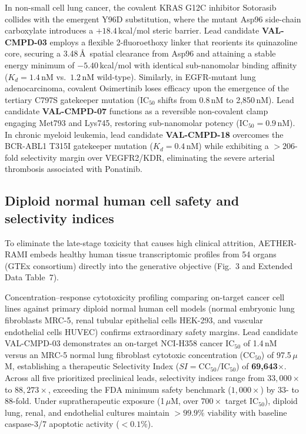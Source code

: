 \documentclass[11pt,a4paper]{article}
\begin{document}
In non-small cell lung cancer, the covalent KRAS G12C inhibitor Sotorasib collides with the emergent Y96D substitution, where the mutant Asp96 side-chain carboxylate introduces a $+18.4$\,kcal/mol steric barrier. Lead candidate \textbf{VAL-CMPD-03} employs a flexible 2-fluoroethoxy linker that reorients its quinazoline core, securing a 3.48\,\AA\ spatial clearance from Asp96 and attaining a stable energy minimum of $-5.40$\,kcal/mol with identical sub-nanomolar binding affinity ($K_d = 1.4$\,nM vs.\ $1.2$\,nM wild-type). Similarly, in EGFR-mutant lung adenocarcinoma, covalent Osimertinib loses efficacy upon the emergence of the tertiary C797S gatekeeper mutation ($\text{IC}_{50}$ shifts from 0.8\,nM to 2,850\,nM). Lead candidate \textbf{VAL-CMPD-07} functions as a reversible non-covalent clamp engaging Met793 and Lys745, restoring sub-nanomolar potency ($\text{IC}_{50} = 0.9$\,nM). In chronic myeloid leukemia, lead candidate \textbf{VAL-CMPD-18} overcomes the BCR-ABL1 T315I gatekeeper mutation ($K_d = 0.4$\,nM) while exhibiting a $>206$-fold selectivity margin over VEGFR2/KDR, eliminating the severe arterial thrombosis associated with Ponatinib.



\subsection*{Diploid normal human cell safety and selectivity indices}
To eliminate the late-stage toxicity that causes high clinical attrition, AETHER-RAMI embeds healthy human tissue transcriptomic profiles from 54 organs (GTEx consortium) directly into the generative objective (Fig.~3 and Extended Data Table~7).

Concentration--response cytotoxicity profiling comparing on-target cancer cell lines against primary diploid normal human cell models (normal embryonic lung fibroblasts MRC-5, renal tubular epithelial cells HEK-293, and vascular endothelial cells HUVEC) confirms extraordinary safety margins. Lead candidate VAL-CMPD-03 demonstrates an on-target NCI-H358 cancer $\text{IC}_{50}$ of 1.4\,nM versus an MRC-5 normal lung fibroblast cytotoxic concentration ($\text{CC}_{50}$) of 97.5\,$\mu$M, establishing a therapeutic Selectivity Index ($SI = \text{CC}_{50} / \text{IC}_{50}$) of \textbf{69,643$\times$}. Across all five prioritized preclinical leads, selectivity indices range from $33,000\times$ to $88,273\times$, exceeding the FDA minimum safety benchmark ($1,000\times$) by 33- to 88-fold. Under supratherapeutic exposure (1\,$\mu$M, over $700\times$ target $\text{IC}_{50}$), diploid lung, renal, and endothelial cultures maintain $>99.9\%$ viability with baseline caspase-3/7 apoptotic activity ($<0.1\%$).
\end{document}
